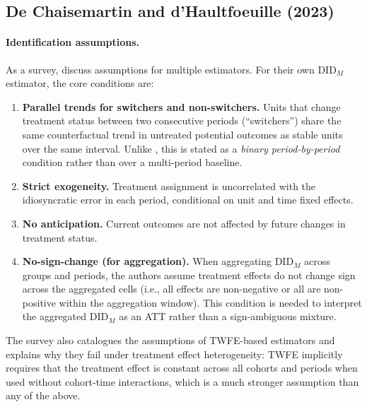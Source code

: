 \documentclass[12pt]{article}
\begin{document}
\subsection{De Chaisemartin and d'Haultfoeuille (2023)}

\paragraph{Identification assumptions.}
As a survey, \citet{dechaisemartin2023twoway} discuss assumptions for multiple
estimators.
For their own DID$_M$ estimator, the core conditions are:
\begin{enumerate}
  \item \textbf{Parallel trends for switchers and non-switchers.}
        Units that change treatment status between two consecutive periods
        (``switchers'') share the same counterfactual trend in untreated
        potential outcomes as stable units over the same interval.
        Unlike \citet{callaway2021difference}, this is stated as a
        \textit{binary period-by-period} condition rather than over a
        multi-period baseline.

  \item \textbf{Strict exogeneity.}
        Treatment assignment is uncorrelated with the idiosyncratic error
        in each period, conditional on unit and time fixed effects.

  \item \textbf{No anticipation.}
        Current outcomes are not affected by future changes in treatment status.

  \item \textbf{No-sign-change (for aggregation).}
        When aggregating DID$_M$ across groups and periods, the authors assume
        treatment effects do not change sign across the aggregated cells
        (i.e., all effects are non-negative or all are non-positive within
        the aggregation window).
        This condition is needed to interpret the aggregated DID$_M$ as an
        ATT rather than a sign-ambiguous mixture.
\end{enumerate}
The survey also catalogues the assumptions of TWFE-based estimators and
explains why they fail under treatment effect heterogeneity: TWFE implicitly
requires that the treatment effect is constant across all cohorts and periods
when used without cohort-time interactions, which is a much stronger assumption
than any of the above.
\end{document}
